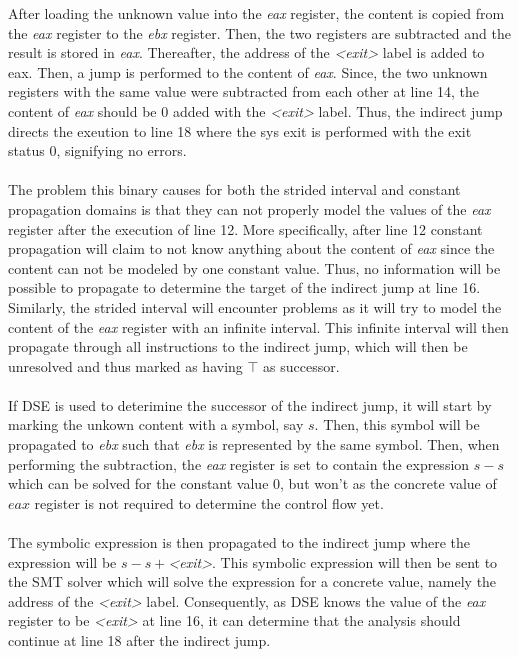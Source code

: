 \documentclass{kththesis}
\renewcommand{\it}[1]{\textit{#1}}
\begin{document}
\noindent
After loading the unknown value into the \it{eax} register, the content is copied from the \it{eax} register to the \it{ebx} register. Then, the two registers are subtracted and the result is stored in \it{eax}. Thereafter, the address of the \it{<exit>} label is added to eax. Then, a jump is performed to the content of \it{eax}. Since, the two unknown registers with the same value were subtracted from each other at line 14, the content of \it{eax} should be $0$ added with the \it{<exit>} label. Thus, the indirect jump directs the exeution to line 18 where the sys exit is performed with the exit status $0$, signifying no errors.
\\ \\
The problem this binary causes for both the strided interval and constant propagation domains is that they can not properly model the values of the \it{eax} register after the execution of line 12. More specifically, after line 12 constant propagation will claim to not know anything about the content of \it{eax} since the content can not be modeled by one constant value. Thus, no information will be possible to propagate to determine the target of the indirect jump at line 16. Similarly, the strided interval will encounter problems as it will try to model the content of the \it{eax} register with an infinite interval. This infinite interval will then propagate through all instructions to the indirect jump, which will then be unresolved and thus marked as having $\top$ as successor.
\\ \\
If DSE is used to deterimine the successor of the indirect jump, it will start by marking the unkown content with a symbol, say $s$. Then, this symbol will be propagated to \it{ebx} such that \it{ebx} is represented by the same symbol. Then, when performing the subtraction, the \it{eax} register is set to contain the expression $s - s$ which can be solved for the constant value $0$, but won't as the concrete value of $eax$ register is not required to determine the control flow yet. 
\\ \\ 
The symbolic expression is then propagated to the indirect jump where the expression will be $s - s + $\it{<exit>}. This symbolic expression will then be sent to the SMT solver which will solve the expression for a concrete value, namely the address of the \it{<exit>} label. Consequently, as DSE knows the value of the \it{eax} register to be \it{<exit>} at line 16, it can determine that the analysis should continue at line 18 after the indirect jump. 
\end{document}
